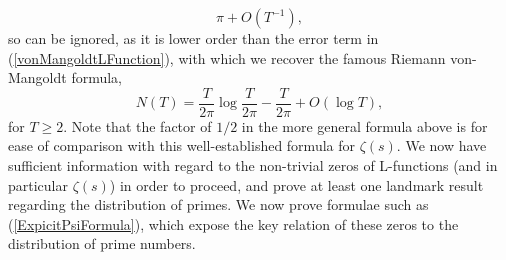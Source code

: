 \begin{equation}
    \pi + O(T^{-1}), \nonumber
\end{equation}
so can be ignored, as it is lower order than the error term in (\ref{vonMangoldtLFunction}), with which we recover the famous Riemann von-Mangoldt formula, 
\begin{equation}
    N(T) = \frac{T}{2\pi} \log \frac{T}{2 \pi} - \frac{T}{2 \pi} + O(\log T), \nonumber
\end{equation}
for $T \geq 2$. Note that the factor of $1/2$ in the more general formula above is for ease of comparison with this well-established formula for $\zeta(s)$. We now have sufficient information with regard to the non-trivial zeros of L-functions (and in particular $\zeta(s)$) in order to proceed, and prove at least one landmark result regarding the distribution of primes. We now prove formulae such as (\ref{ExpicitPsiFormula}), which expose the key relation of these zeros to the distribution of prime numbers. 